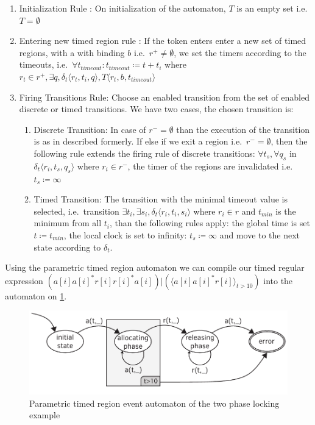 		\begin{enumerate}
			\item Initialization Rule : On initialization of the automaton, $T$ is an empty set
			i.e.~$T = \emptyset$
		
			\item Entering new timed region rule :
			If the token enters enter a new set of timed regions, with a with binding $b$ 
			i.e.~$r^+ \neq \emptyset$, 
			we set the timers according to the timeouts, 
			i.e.~$\forall t_{timeout} : t_{timeout} \coloneqq t + t_i $ where $ r_t \in r^+, \exists q ,\delta_t\langle  r_t,t_i,q \rangle, T \langle r_t,b, t_{timeout} \rangle$
			
			\item Firing Transitions Rule: Choose an enabled transition from the set of enabled discrete or timed transitions. 
			We have two cases, the chosen transition is:
				\begin{enumerate}
					\item Discrete Transition: In case of $r^- = \emptyset$ than the execution of the transition is as in described formerly. 
						If else if we exit a region i.e.~$r^- = \emptyset$, 
						then the following rule extends the firing rule of discrete transitions:
						$\forall t_s, \forall q_s$ in $ \delta_t \langle r_i, t_s, q_s \rangle$ where $r_i \in r^-$, the timer of the regions are invalidated i.e.~
						$t_s \coloneqq \infty$
					\item Timed Transition: The transition with the minimal timeout value is selected, 
					 i.e.~transition $\exists t_i, \exists s_i, \delta_t \langle r_i, t_i, s_i \rangle$ where $ r_i \in r$ and $t_{min}$ is the minimum from all $t_i$,
					 than the following rules apply:
					 the global time is set $t \coloneqq t_{min}$, 
					 the local clock is set to infinity: $t_s \coloneqq \infty$ 
					 and move to the next state according to $\delta_t$.
				\end{enumerate}			
		\end{enumerate}

		Using the parametric timed region automaton we can compile our timed regular expression 
		$(a[i] a[i]^\ast  r[i] r[i]^\ast a[i]) | (\langle a[i] a[i]^\ast r[i]\rangle_{t > 10} )$ into the automaton on \cref{fig:cep:ptrea}.


		\begin{figure}[h]
		\centering
		\includegraphics[width=0.7\linewidth]{figures/chapter_4/allocating_timed_parametric}
		\caption{Parametric timed region event automaton of the two phase locking example \redraw}
		\label{fig:cep:ptrea}
		\end{figure}

